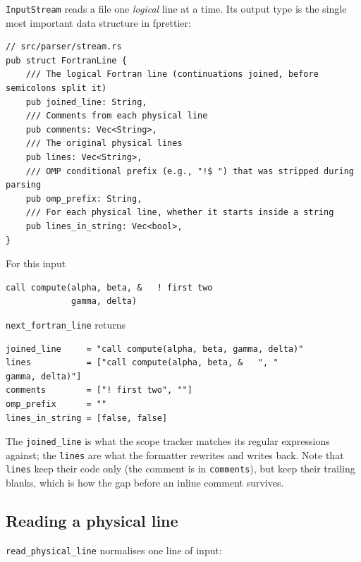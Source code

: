 \documentclass[11pt,a4paper,openany]{book}
\newcommand{\code}[1]{\texttt{\small #1}}
\begin{document}
\code{InputStream} reads a file one \emph{logical} line at a time. Its output
type is the single most important data structure in fprettier:

\begin{lstlisting}[style=rust]
// src/parser/stream.rs
pub struct FortranLine {
    /// The logical Fortran line (continuations joined, before semicolons split it)
    pub joined_line: String,
    /// Comments from each physical line
    pub comments: Vec<String>,
    /// The original physical lines
    pub lines: Vec<String>,
    /// OMP conditional prefix (e.g., "!$ ") that was stripped during parsing
    pub omp_prefix: String,
    /// For each physical line, whether it starts inside a string
    pub lines_in_string: Vec<bool>,
}
\end{lstlisting}

For this input

\begin{lstlisting}[style=fortran]
call compute(alpha, beta, &   ! first two
             gamma, delta)
\end{lstlisting}

\code{next\_fortran\_line} returns

\begin{lstlisting}[style=plain]
joined_line     = "call compute(alpha, beta, gamma, delta)"
lines           = ["call compute(alpha, beta, &   ", "             gamma, delta)"]
comments        = ["! first two", ""]
omp_prefix      = ""
lines_in_string = [false, false]
\end{lstlisting}

The \code{joined\_line} is what the scope tracker matches its regular
expressions against; the \code{lines} are what the formatter rewrites and
writes back. Note that \code{lines} keep their code only (the comment is in
\code{comments}), but keep their trailing blanks, which is how the gap before
an inline comment survives.

\subsection{Reading a physical line}

\code{read\_physical\_line} normalises one line of input:
\end{document}
